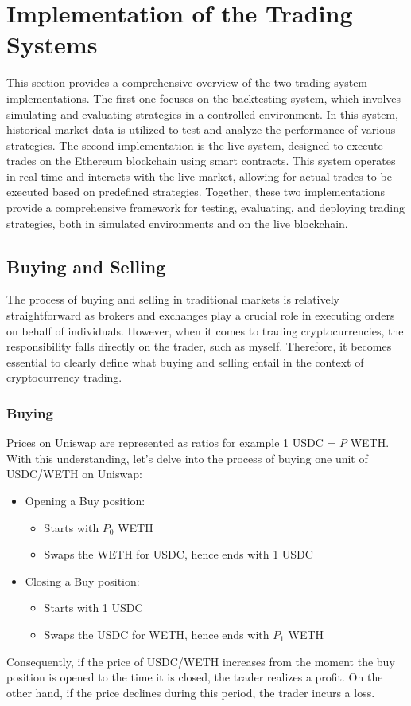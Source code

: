 \chapter{Implementation of the Trading Systems}
This section provides a comprehensive overview of the two trading system implementations. The first one focuses on the backtesting system, which involves simulating and evaluating strategies in a controlled environment. In this system, historical market data is utilized to test and analyze the performance of various strategies. The second implementation is the live system, designed to execute trades on the Ethereum blockchain using smart contracts. This system operates in real-time and interacts with the live market, allowing for actual trades to be executed based on predefined strategies. Together, these two implementations provide a comprehensive framework for testing, evaluating, and deploying trading strategies, both in simulated environments and on the live blockchain.

\section{Buying and Selling}
The process of buying and selling in traditional markets is relatively straightforward as brokers and exchanges play a crucial role in executing orders on behalf of individuals. However, when it comes to trading cryptocurrencies, the responsibility falls directly on the trader, such as myself. Therefore, it becomes essential to clearly define what buying and selling entail in the context of cryptocurrency trading.

\subsection{Buying}
Prices on Uniswap are represented as ratios for example 1 USDC = $P$ WETH. With this understanding, let's delve into the process of buying one unit of USDC/WETH on Uniswap:
\begin{itemize}
    \item Opening a Buy position:\begin{itemize}
        \item Starts with $P_{0}$ WETH
        \item Swaps the WETH for USDC, hence ends with 1 USDC
    \end{itemize}
    \item Closing a Buy position:\begin{itemize}
        \item Starts with 1 USDC
        \item Swaps the USDC for WETH, hence ends with $P_1$ WETH
    \end{itemize}
\end{itemize}
\noindent Consequently, if the price of USDC/WETH increases from the moment the buy position is opened to the time it is closed, the trader realizes a profit. On the other hand, if the price declines during this period, the trader incurs a loss.

